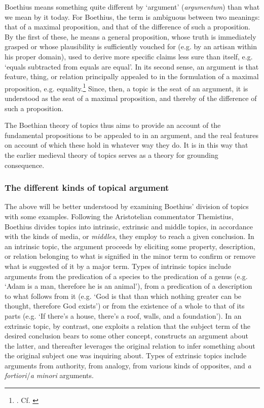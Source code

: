 \documentclass[a4paper, 11pt]{article}
\begin{document}
Boethius means something quite different by `argument' (\emph{argumentum}) than what we mean by it today. For Boethius, the term is ambiguous between two meanings: that of a maximal proposition, and that of the difference of such a proposition. By the first of these, he means a general proposition, whose truth is immediately grasped or whose plausibility is sufficiently vouched for (e.g. by an artisan within his proper domain), used to derive more specific claims less sure than itself, e.g. `equals subtracted from equals are equal'. In its second sense, an argument is that feature, thing, or relation principally appealed to in the formulation of a maximal proposition, e.g. equality.\footnote{\autocite[1185A-B]{BDT}. Cf. \autocite{Holopainen2007,Archambault2017e}} Since, then, a topic is the seat of an argument, it is understood as the seat of a maximal proposition, and thereby of the difference of such a proposition. 

The Boethian theory of topics thus aims to provide an account of the fundamental propositions to be appealed to in an argument, and the real features on account of which these hold in whatever way they do. It is in this way that the earlier medieval theory of topics serves as a theory for grounding consequence.

\subsubsection{The different kinds of topical argument}
The above will be better understood by examining Boethius' division of topics with some examples. Following the Aristotelian commentator Themistius, Boethius divides topics into intrinsic, extrinsic and middle topics, in accordance with the kinds of media, or \emph{middles}, they employ to reach a given conclusion. In an intrinsic topic, the argument proceeds by eliciting some property, description, or relation belonging to what is signified in the minor term to confirm or remove what is suggested of it by a major term. Types of intrinsic topics include arguments from the predication of a species to the predication of a genus (e.g. `Adam is a man, therefore he is an animal'), from a predication of a description to what follows from it (e.g. `God is that than which nothing greater can be thought, therefore God exists') or from the existence of a whole to that of its parts (e.g. `If there's a house, there's a roof, walls, and a foundation'). In an extrinsic topic, by contrast, one exploits a relation that the subject term of the desired conclusion bears to some other concept, constructs an argument about the latter, and thereafter leverages the original relation to infer something about the original subject one was inquiring about. Types of extrinsic topics include arguments from authority, from analogy, from various kinds of opposites, and \emph{a fortiori}/\emph{a minori} arguments.
\end{document}
